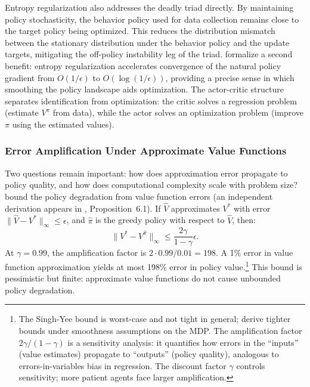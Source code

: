 Entropy regularization also addresses the deadly triad directly. By maintaining policy stochasticity, the behavior policy used for data collection remains close to the target policy being optimized. This reduces the distribution mismatch between the stationary distribution under the behavior policy and the update targets, mitigating the off-policy instability leg of the triad. \citet{cen2022fast} formalize a second benefit: entropy regularization accelerates convergence of the natural policy gradient from $O(1/\epsilon)$ to $O(\log(1/\epsilon))$, providing a precise sense in which smoothing the policy landscape aids optimization. The actor-critic structure separates identification from optimization: the critic solves a regression problem (estimate $V^\pi$ from data), while the actor solves an optimization problem (improve $\pi$ using the estimated values).

\subsubsection{Error Amplification Under Approximate Value Functions}

Two questions remain important: how does approximation error propagate to policy quality, and how does computational complexity scale with problem size? \citet{singh1994} bound the policy degradation from value function errors (an independent derivation appears in \citealt{bertsekastsitsiklis1996}, Proposition~6.1). If $\hat{V}$ approximates $V^*$ with error $\|\hat{V} - V^*\|_\infty \leq \epsilon$, and $\hat{\pi}$ is the greedy policy with respect to $\hat{V}$, then:
\begin{equation}
\|V^* - V^{\hat{\pi}}\|_\infty \leq \frac{2\gamma}{1-\gamma} \epsilon.
\label{eq:singh_yee}
\end{equation}
At $\gamma = 0.99$, the amplification factor is $2 \cdot 0.99 / 0.01 = 198$. A 1\% error in value function approximation yields at most 198\% error in policy value.\footnote{The Singh-Yee bound is worst-case and not tight in general; \citet{farahmand2010} derive tighter bounds under smoothness assumptions on the MDP. The amplification factor $2\gamma/(1-\gamma)$ is a sensitivity analysis: it quantifies how errors in the ``inputs'' (value estimates) propagate to ``outputs'' (policy quality), analogous to errors-in-variables bias in regression. The discount factor $\gamma$ controls sensitivity; more patient agents face larger amplification.} This bound is pessimistic but finite: approximate value functions do not cause unbounded policy degradation.

